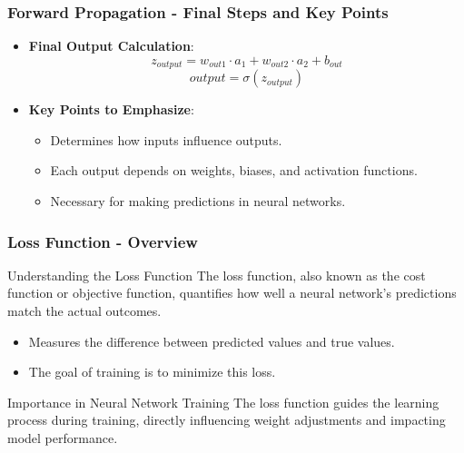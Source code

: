 \documentclass[aspectratio=169]{beamer}
\begin{document}
\begin{frame}[fragile]
    \frametitle{Forward Propagation - Final Steps and Key Points}
    \begin{itemize}
        \item \textbf{Final Output Calculation}:
        \begin{equation}
            z_{output} = w_{out1} \cdot a_1 + w_{out2} \cdot a_2 + b_{out}
        \end{equation}
        \begin{equation}
            output = \sigma(z_{output})
        \end{equation}

        \item \textbf{Key Points to Emphasize}:
        \begin{itemize}
            \item Determines how inputs influence outputs.
            \item Each output depends on weights, biases, and activation functions.
            \item Necessary for making predictions in neural networks.
        \end{itemize}
    \end{itemize}
\end{frame}

\begin{frame}[fragile]
    \frametitle{Loss Function - Overview}
    \begin{block}{Understanding the Loss Function}
        The loss function, also known as the cost function or objective function, quantifies how well a neural network's predictions match the actual outcomes.
        \begin{itemize}
            \item Measures the difference between predicted values and true values.
            \item The goal of training is to minimize this loss.
        \end{itemize}
    \end{block}
    \begin{block}{Importance in Neural Network Training}
        The loss function guides the learning process during training, directly influencing weight adjustments and impacting model performance.
    \end{block}
\end{frame}
\end{document}
